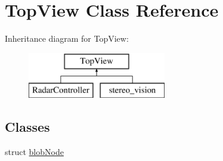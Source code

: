 \hypertarget{class_top_view}{}\section{Top\+View Class Reference}
\label{class_top_view}
Inheritance diagram for Top\+View\+:\begin{figure}[H]
\begin{center}
\leavevmode
\includegraphics[height=2.000000cm]{class_top_view}
\end{center}
\end{figure}
\subsection*{Classes}
\begin{DoxyCompactItemize}
\item 
struct \hyperlink{struct_top_view_1_1blob_node}{blob\+Node}
\end{DoxyCompactItemize}
